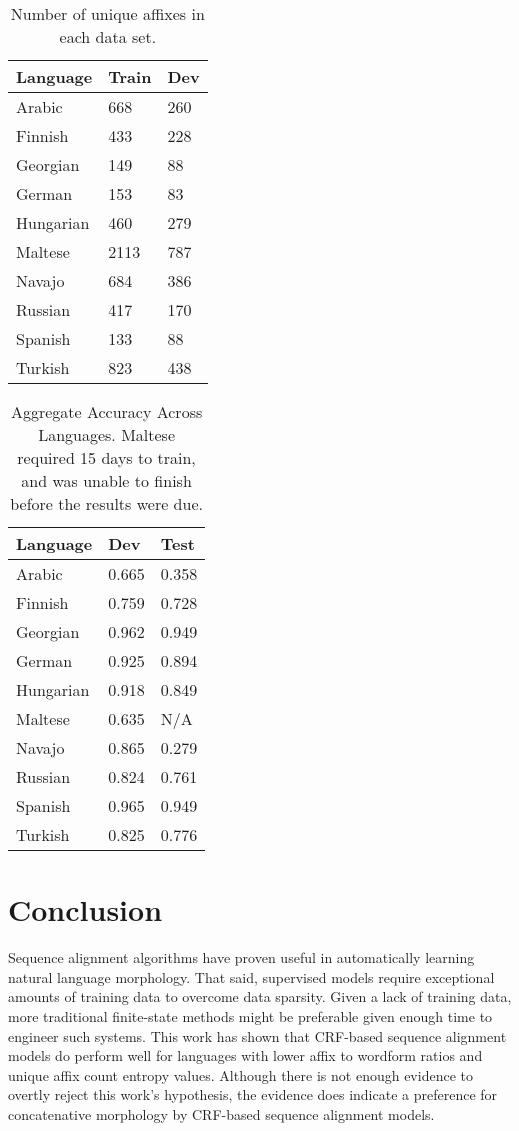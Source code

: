 \documentclass[11pt]{article}
\begin{document}
\begin{table}
	\centering
\begin{tabular}{l l l}
    Language    &   Train   &   Dev \\\hline
Arabic      &   668     &   260 \\
Finnish     &   433     &   228 \\
Georgian    &   149     &   88  \\
German      &   153     &   83  \\
Hungarian   &   460     &   279 \\
Maltese     &   2113    &   787 \\
Navajo      &   684     &   386 \\
Russian     &   417     &   170 \\
Spanish     &   133     &   88  \\
Turkish     &   823     &   438 \\
	\end{tabular}
    \caption{Number of unique affixes in each data set.}
    \label{tab:affixes}

\end{table}
\begin{table}
	\centering
	\begin{tabular}{l l l}
Language    & 	Dev    &   Test\\\hline
Arabic      &0.665     &   0.358\\
Finnish     &0.759     &   0.728\\
Georgian    &0.962     &   0.949\\
German      &0.925     &   0.894\\
Hungarian   &0.918     &   0.849\\
Maltese     &0.635     &   N/A\\
Navajo      &0.865     &   0.279\\
Russian     &0.824     &   0.761\\
Spanish     &0.965     &   0.949\\
Turkish     &0.825     &   0.776\\
	\end{tabular}
	\caption{Aggregate Accuracy Across Languages. Maltese required 15 days to train, and was unable to finish before the results were due.}
	\label{tab:scores}
\end{table}
\section*{Conclusion}
Sequence alignment algorithms have proven useful in automatically learning natural language morphology.
That said, supervised models require exceptional amounts of training data to overcome data sparsity. 
Given a lack of training data, more traditional finite-state methods might be preferable given enough time to engineer such systems.
This work has shown that CRF-based sequence alignment models do perform well for languages with lower affix to wordform ratios and unique affix count entropy values. 
Although there is not enough evidence to overtly reject this work's hypothesis, the evidence does indicate a preference for concatenative morphology by CRF-based sequence alignment models.
\end{document}
